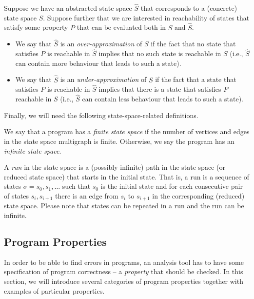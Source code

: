 \begin{definition}
  Suppose we have an abstracted state space $\widehat{S}$ that corresponds to a (concrete) state space $S$.
  Suppose further that we are interested in reachability of states that satisfy some property $P$ that can be evaluated both in $S$ and $\widehat{S}$.
  \begin{itemize}
    \item We say that $\widehat{S}$ is an \emph{over-approximation} of $S$ if the fact that no state that satisfies $P$ is reachable in $\widehat{S}$ implies that no such state is reachable in $S$ (i.e., $\widehat{S}$ can contain more behaviour that leads to such a state).
    \item We say that $\widehat{S}$ is an \emph{under-approximation} of $S$ if the fact that a state that satisfies $P$ is reachable in $\widehat{S}$ implies that there is a state that satisfies $P$ reachable in $S$ (i.e., $\widehat{S}$ can contain less behaviour that leads to such a state).
    \end{itemize}
\end{definition}

Finally, we will need the following state-space-related definitions.

\begin{definition}
We say that a program has a \emph{finite state space} if the number of vertices and edges in the state space multigraph is finite.
Otherwise, we say the program has an \emph{infinite state space}.
\end{definition}

\begin{definition}[Run]
A \emph{run} in the state space is a (possibly infinite) path in the state space (or reduced state space) that starts in the initial state.
That is, a run is a sequence of states $\sigma = s_0, s_1, …$ such that $s_0$ is the initial state and for each consecutive pair of states $s_i, s_{i+1}$ there is an edge from $s_i$ to $s_{i + 1}$ in the corresponding (reduced) state space.
Please note that states can be repeated in a run and the run can be infinite.
\end{definition}

\subsection{Program Properties}

In order to be able to find errors in programs, an analysis tool has to have
some specification of program correctness -- a \emph{property} that should be
checked.
In this section, we will introduce several categories of program properties
together with examples of particular properties.

